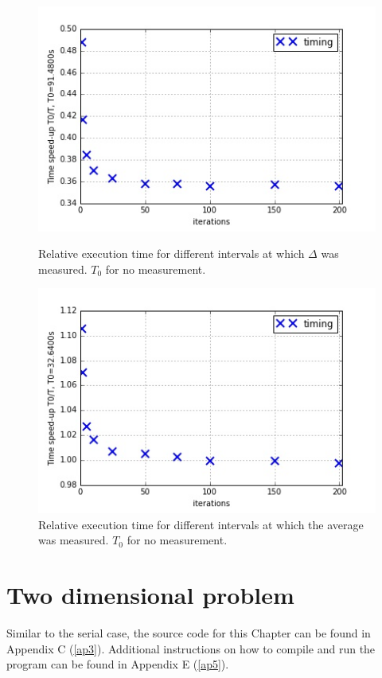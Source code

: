 \documentclass[11pt]{article}
\begin{document}
	\begin{figure}[ht]	
		\centering
		\begin{minipage}[b]{.5\textwidth}
			\centering
			\includegraphics[width=\linewidth]{serialvs4.jpeg}
			\caption[short]{Relative execution time for different intervals at which $\Delta$ was measured. $T_0$ for no measurement.}\label{serial4}
		\end{minipage}%
		\begin{minipage}[b]{.5\textwidth}
			\centering
			\includegraphics[width=\linewidth]{serialvs5.jpeg}
			\caption[short]{Relative execution time for different intervals at which the average was measured. $T_0$ for no measurement.}\label{serial5}
		\end{minipage}%
	\end{figure}

	\section{Two dimensional problem}
	Similar to the serial case, the source code for this Chapter can be found in Appendix C (\ref{ap3}). Additional instructions on how to compile and run the program can be found in Appendix E (\ref{ap5}).
	
\end{document}
